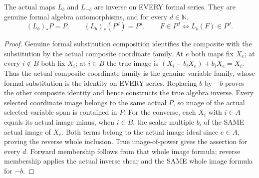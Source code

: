 \begin{theorem}
\label{hir:actual-formal-center-shear-inverse-and-powers}
The actual maps $L_b$ and $L_{-b}$ are inverse on EVERY formal series.
They are genuine formal algebra automorphisms, and for every $d\in\mathbb N$,
\[
 (L_b)_*P=P,\qquad (L_b)_*(P^d)=P^d,
 \qquad F\in P^d\Longleftrightarrow L_b(F)\in P^d.
\]
\leanok
\end{theorem}
\begin{proof}
Genuine formal substitution composition identifies the composite with
the substitution by the actual composite coordinate family. At $e$
both maps fix $X_e$; at every $i\notin B$ both fix $X_i$; at $i\in B$
the true image is $(X_i-b_iX_e)+b_iX_e=X_i$.
Thus the actual composite coordinate family is the genuine variable
family, whose formal substitution is the identity on EVERY series.
Replacing $b$ by $-b$ proves the other composite identity and hence
constructs the true algebra inverse.
Every selected coordinate image belongs to the same actual $P$,
so image of the actual selected-variable span is contained in $P$.
For the converse, each $X_i$ with $i\in A$ equals its actual image
minus, when $i\in B$, the scalar multiple $b_i$ of the SAME actual
image of $X_e$. Both terms belong to the actual image ideal since
$e\in A$, proving the reverse whole inclusion. True image-of-power
gives the assertion for every $d$. Forward membership follows from
that whole image formula; reverse membership applies the actual
inverse shear and the SAME whole image formula for $-b$.
\end{proof}

